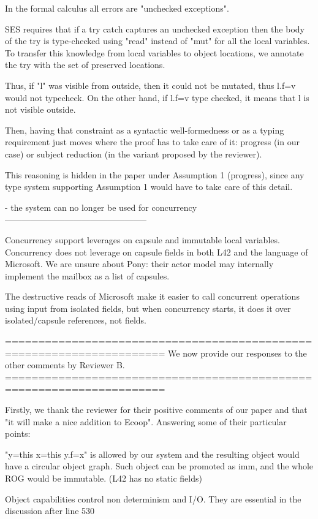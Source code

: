 In the formal calculus all errors are "unchecked exceptions".

SES requires that if a try catch captures an unchecked exception then the body of the try
is type-checked using "read" instead of "mut" for all the local variables.
To transfer this knowledge from local variables to object locations, we annotate the try with
the set of preserved locations.

Thus, if "l" was visible from outside, then it could not be mutated, thus l.f=v would not typecheck.
On the other hand, if l.f=v type checked, it means that l is not visible outside.

Then, having that constraint as a syntactic well-formedness or as a typing requirement just moves 
where the proof has to take care of it: progress (in our case) or subject reduction
(in the variant proposed by the reviewer).

This reasoning is hidden in the paper under Assumption 1 (progress), since any type system
supporting Assumption 1 would have to take care of this detail.

- the system can no longer be used for concurrency
--------------------------------------------------

Concurrency support leverages on capsule and immutable local variables.
Concurrency does not leverage on capsule fields in both L42 and the language of Microsoft.
We are unsure about Pony: their actor model may internally implement the mailbox as a list of capsules.



The destructive reads of Microsoft make it easier to call concurrent operations using input
from isolated fields, but when concurrency starts, it does it over isolated/capsule references, not fields.


======================================================================
We now provide our responses to the other comments by Reviewer B.
======================================================================

Firstly, we thank the reviewer for their positive comments of our paper and that "it will make a nice addition to Ecoop".
Answering some of their particular points: 

"y=this x=this y.f=x" is allowed by our system and the resulting object would have a circular object graph.
Such object can be promoted as imm, and the whole ROG would be immutable.
(L42 has no static fields)

Object capabilities control non determinism and I/O. They are essential in the discussion after line 530


